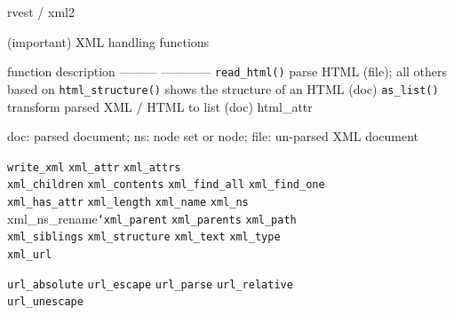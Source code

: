 \documentclass[ignorenonframetext,]{beamer}
\begin{document}
\begin{frame}{rvest / xml2}

\end{frame}

\begin{frame}[fragile]{(important) XML handling functions}

function \textbar{} description --------- \textbar{} ------------
\texttt{read\_html()} \textbar{} parse HTML (file); all others based on
\texttt{html\_structure()} \textbar{} shows the structure of an HTML
(doc) \texttt{as\_list()} \textbar{} transform parsed XML / HTML to list
(doc) html\_attr

doc: parsed document; ns: node set or node; file: un-parsed XML document

\texttt{write\_xml} \texttt{xml\_attr} \texttt{xml\_attrs}\\
\texttt{xml\_children} \texttt{xml\_contents} \texttt{xml\_find\_all}
\texttt{xml\_find\_one}\\
\texttt{xml\_has\_attr} \texttt{xml\_length} \texttt{xml\_name}
\texttt{xml\_ns}\\
xml\_ns\_rename\texttt{`xml\_parent} \texttt{xml\_parents}
\texttt{xml\_path}\\
\texttt{xml\_siblings} \texttt{xml\_structure} \texttt{xml\_text}
\texttt{xml\_type}\\
\texttt{xml\_url}

\texttt{url\_absolute} \texttt{url\_escape} \texttt{url\_parse}
\texttt{url\_relative}\\
\texttt{url\_unescape}

\end{frame}
\end{document}
